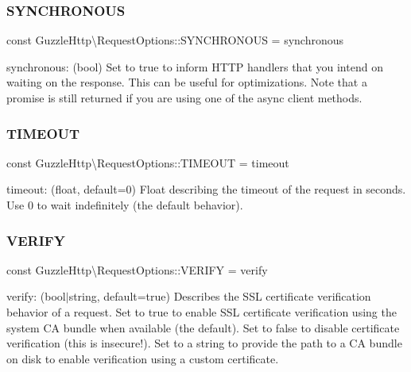 \subsubsection{\texorpdfstring{S\+Y\+N\+C\+H\+R\+O\+N\+O\+US}{SYNCHRONOUS}}
{\footnotesize\ttfamily const Guzzle\+Http\textbackslash{}\+Request\+Options\+::\+S\+Y\+N\+C\+H\+R\+O\+N\+O\+US = \textquotesingle{}synchronous\textquotesingle{}}

synchronous\+: (bool) Set to true to inform H\+T\+TP handlers that you intend on waiting on the response. This can be useful for optimizations. Note that a promise is still returned if you are using one of the async client methods. \mbox{\label{classGuzzleHttp_1_1RequestOptions_a444b9671807d0a4cda7a1c0fc9571d3b}} 
\subsubsection{\texorpdfstring{T\+I\+M\+E\+O\+UT}{TIMEOUT}}
{\footnotesize\ttfamily const Guzzle\+Http\textbackslash{}\+Request\+Options\+::\+T\+I\+M\+E\+O\+UT = \textquotesingle{}timeout\textquotesingle{}}

timeout\+: (float, default=0) Float describing the timeout of the request in seconds. Use 0 to wait indefinitely (the default behavior). \mbox{\label{classGuzzleHttp_1_1RequestOptions_a7f085866a7fc8c0d6ed835d6225c697d}} 
\subsubsection{\texorpdfstring{V\+E\+R\+I\+FY}{VERIFY}}
{\footnotesize\ttfamily const Guzzle\+Http\textbackslash{}\+Request\+Options\+::\+V\+E\+R\+I\+FY = \textquotesingle{}verify\textquotesingle{}}

verify\+: (bool$\vert$string, default=true) Describes the S\+SL certificate verification behavior of a request. Set to true to enable S\+SL certificate verification using the system CA bundle when available (the default). Set to false to disable certificate verification (this is insecure!). Set to a string to provide the path to a CA bundle on disk to enable verification using a custom certificate. \mbox{\label{classGuzzleHttp_1_1RequestOptions_a507d60351967e5080faa7d1828effaa2}} 
